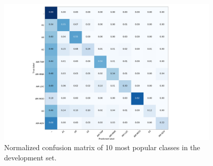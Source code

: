 \documentclass{scrartcl}
\begin{document}
\begin{figure}[h!]
\centering
\includegraphics[width=400]{figures/fig3.png}
\caption{Normalized confusion matrix of 10 most popular classes in the development set.}
\label{fig:3}
\end{figure}

\clearpage


\end{document}
